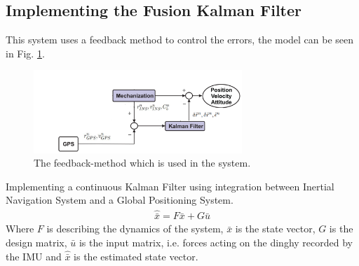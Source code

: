\subsection{Implementing the Fusion Kalman Filter}
This system uses a feedback method to control the errors, the model can be seen in Fig. \ref{Fig:Feedback}.
\begin{figure}[H]
\centering
\includegraphics[width=0.7\textwidth]{Figures/feed-back.png}
\caption{The feedback-method which is used in the system.}
\label{Fig:Feedback}
\end{figure}
Implementing a continuous Kalman Filter using integration between Inertial Navigation System and a Global Positioning System.
\begin{align}
\hat{\bar{x}} = F \bar{x} + G \bar{u}
\label{eq.state_1}
\end{align}
Where $F$ is describing the dynamics of the system, $\bar{x}$ is the state vector, $G$ is the design matrix, $\bar{u}$ is the input matrix, i.e. forces acting on the dinghy recorded by the IMU and $\hat{\bar{x}}$ is the estimated state vector. \\

